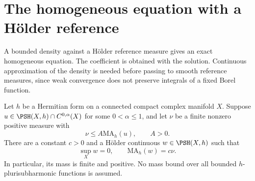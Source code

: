\section{The homogeneous equation with a H\"older reference}

A bounded density against a H\"older reference measure gives an exact homogeneous equation. The coefficient is obtained with the solution. Continuous approximation of the density is needed before passing to smooth reference measures, since weak convergence does not preserve integrals of a fixed Borel function.

\begin{theorem}\label{thm:holder-reference-homogeneous-equation}
Let $h$ be a Hermitian form on a connected compact complex manifold $X$. Suppose $u\in\PSH(X,h)\cap C^{0,\alpha}(X)$ for some $0<\alpha\leq1$, and let $\nu$ be a finite nonzero positive measure with
\[
 \nu\leq A\mathrm{MA}_h(u),\qquad A>0.
\]
There are a constant $c>0$ and a H\"older continuous $w\in\PSH(X,h)$ such that
\[
 \sup_Xw=0,\qquad\mathrm{MA}_h(w)=c\nu.
\]
In particular, its mass is finite and positive. No mass bound over all bounded $h$-plurisubharmonic functions is assumed.
\end{theorem}
